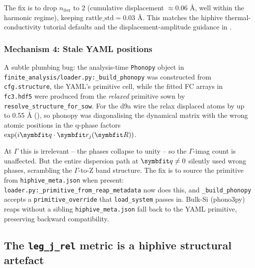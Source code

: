 The fix is to drop $n_\mathrm{iter}$ to 2 (cumulative displacement
$\approx 0.06$ Å, well within the harmonic regime), keeping
$\mathrm{rattle\_std}=0.03$ Å.  This matches the hiphive
thermal-conductivity tutorial defaults and the displacement-amplitude
guidance in \cite{eriksson_hiphive_2019}.

\subsubsection{Mechanism 4: Stale YAML positions}
\label{sec:stale_yaml}

A subtle plumbing bug: the analysis-time \texttt{Phonopy} object in
\texttt{finite\_analysis/loader.py:\_build\_phonopy} was constructed
from \texttt{cfg.structure}, the YAML's primitive cell, while the
fitted FC arrays in \texttt{fc3.hdf5} were produced from the
\emph{relaxed} primitive sown by
\texttt{resolve\_structure\_for\_sow}.  For the d9a wire the relax
displaced atoms by up to 0.55 Å (),
so phonopy was diagonalising the dynamical matrix with the wrong atomic
positions in the q-phase factors $\exp(i\vc{q}\cdot \vc{r}_{j}(\vc{R}))$.

At $\Gamma$ this is irrelevant -- the phases collapse to unity -- so
the $\Gamma$-imag count is unaffected.  But the entire dispersion path
at $\vc{q} \neq 0$ silently used wrong phases, scrambling the $\Gamma$-to-Z
band structure.  The fix is to source the primitive from
\texttt{hiphive\_meta.json} when present:
\texttt{loader.py:\_primitive\_from\_reap\_metadata} now does this, and
\texttt{\_build\_phonopy} accepts a \texttt{primitive\_override} that
\texttt{load\_system} passes in.  Bulk-Si (phono3py) reaps without a
sibling \texttt{hiphive\_meta.json} fall back to the YAML primitive,
preserving backward compatibility.

\subsection{The \texttt{leg\_j\_rel} metric is a hiphive structural artefact}
\label{sec:leg_j_rel}

